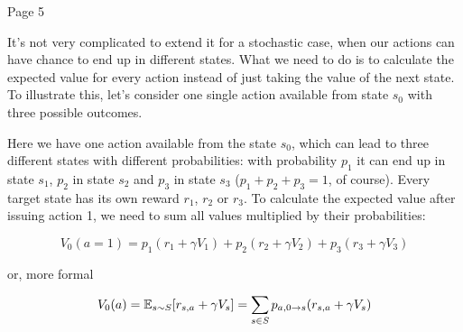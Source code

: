 Page 5

It’s not very complicated to extend it for a stochastic case, when our
actions can have chance to end up in different states. What we need to do is to
calculate the expected value for every action instead of just taking the value
of the next state. To illustrate this, let’s consider one single action
available from state \begin{math}s_0\end{math} with three possible outcomes.

Here we have one action available from the state \begin{math}s_0\end{math}, which can lead to three
different states with different probabilities: with probability \begin{math}p_1\end{math} it can end up
in state \begin{math}s_1\end{math}, \begin{math}p_2\end{math} in state \begin{math}s_2\end{math} and
\begin{math}p_3\end{math} in state \begin{math}s_3\end{math} (\begin{math}p_1+p_2+p_3=1\end{math}, of course). Every
target state has its own reward \begin{math}r_1\end{math}, \begin{math}r_2\end{math} or \begin{math}r_3\end{math}. To calculate the expected value
after issuing action 1, we need to sum all values multiplied by their probabilities:


\begin{equation*}
  V_0(a=1) = p_1(r_1 + \gamma V_1) + p_2(r_2 + \gamma V_2) + p_3(r_3 + \gamma
  V_3)
\end{equation*}

or, more formal

\begin{equation*}
  V_0(a) = \operatorname{\mathbb{E}}_{s \sim S}[r_{s,a} + \gamma V_s] = \sum_{s\in S} p_{a,0 \rightarrow s}(r_{s,a} + \gamma
  V_s)
\end{equation*}

